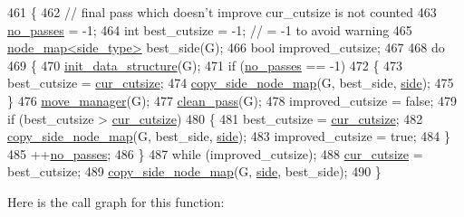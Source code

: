 \begin{DoxyCode}
461 \{
462     \textcolor{comment}{// final pass which doesn't improve cur\_cutsize is not counted}
463     \mbox{\hyperlink{classfm__partition_af35277f499ad76a979ee33b0cd388dc5}{no\_passes}} = -1;
464     \textcolor{keywordtype}{int} best\_cutsize = -1;  \textcolor{comment}{// = -1 to avoid warning}
465     \mbox{\hyperlink{classnode__map}{node\_map<side\_type>}} best\_side(G);
466     \textcolor{keywordtype}{bool} improved\_cutsize;
467 
468     \textcolor{keywordflow}{do}
469     \{
470     \mbox{\hyperlink{classfm__partition_a9aa27d4c97616c0fdbd00d11dc83bc0b}{init\_data\_structure}}(G);
471     \textcolor{keywordflow}{if} (\mbox{\hyperlink{classfm__partition_af35277f499ad76a979ee33b0cd388dc5}{no\_passes}} == -1)
472     \{
473         best\_cutsize = \mbox{\hyperlink{classfm__partition_abc8f24c354d2a15f8ec8ef9a46252c93}{cur\_cutsize}};
474         \mbox{\hyperlink{classfm__partition_a33d1dbba0ce9e398adab753f403deac3}{copy\_side\_node\_map}}(G, best\_side, \mbox{\hyperlink{classfm__partition_af83309e781e9658fc0ff923ced087bfc}{side}});
475     \}
476     \mbox{\hyperlink{classfm__partition_a91572409b30f0967ea3782079f69b1bb}{move\_manager}}(G);
477     \mbox{\hyperlink{classfm__partition_a15197263e5318f824e0cde66ea9132b7}{clean\_pass}}(G);
478     improved\_cutsize = \textcolor{keyword}{false};
479     \textcolor{keywordflow}{if} (best\_cutsize > \mbox{\hyperlink{classfm__partition_abc8f24c354d2a15f8ec8ef9a46252c93}{cur\_cutsize}})
480     \{
481         best\_cutsize = \mbox{\hyperlink{classfm__partition_abc8f24c354d2a15f8ec8ef9a46252c93}{cur\_cutsize}};
482         \mbox{\hyperlink{classfm__partition_a33d1dbba0ce9e398adab753f403deac3}{copy\_side\_node\_map}}(G, best\_side, \mbox{\hyperlink{classfm__partition_af83309e781e9658fc0ff923ced087bfc}{side}});
483         improved\_cutsize = \textcolor{keyword}{true};
484     \}
485     ++\mbox{\hyperlink{classfm__partition_af35277f499ad76a979ee33b0cd388dc5}{no\_passes}};
486     \}
487     \textcolor{keywordflow}{while} (improved\_cutsize);
488     \mbox{\hyperlink{classfm__partition_abc8f24c354d2a15f8ec8ef9a46252c93}{cur\_cutsize}} = best\_cutsize;
489     \mbox{\hyperlink{classfm__partition_a33d1dbba0ce9e398adab753f403deac3}{copy\_side\_node\_map}}(G, \mbox{\hyperlink{classfm__partition_af83309e781e9658fc0ff923ced087bfc}{side}}, best\_side);
490 \}
\end{DoxyCode}
Here is the call graph for this function\+:\nopagebreak
